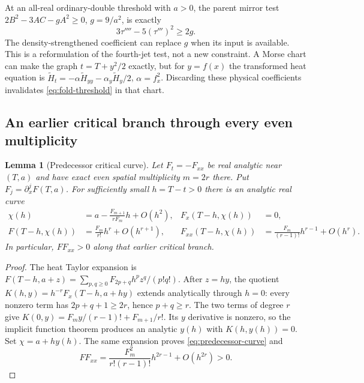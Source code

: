 \documentclass[11pt]{article}
\newtheorem{lemma}[theorem]{Lemma}
\theoremstyle{definition}
\theoremstyle{remark}
\begin{document}
At an all-real ordinary-double threshold with $a>0$, the parent mirror
test $2B^2-3AC-gA^2\ge0$, $g=9/a^2$, is exactly
\begin{equation}
 3\tau''''-5(\tau''')^2\ge2g.
 \label{eq:fold-threshold}
\end{equation}
The density-strengthened coefficient can replace $g$ when its input is
available. This is a reformulation of the fourth-jet test, not a new
constraint. A Morse chart can make the graph $t=T+y^2/2$ exactly, but
for $y=f(x)$ the transformed heat equation is
$\widetilde H_t=-\alpha\widetilde H_{yy}
-\alpha_y\widetilde H_y/2$, $\alpha=f_x^2$.
Discarding these physical coefficients invalidates
\eqref{eq:fold-threshold} in that chart.

\subsection{An earlier critical branch through every even multiplicity}

\begin{lemma}[Predecessor critical curve]
\label{lem:predecessor}
Let $F_t=-F_{xx}$ be real analytic near $(T,a)$ and have exact even
spatial multiplicity $m=2r$ there. Put $F_j=\partial_x^jF(T,a)$.
For sufficiently small $h=T-t>0$ there is an analytic real curve
\begin{align}
 \chi(h)&=a-\frac{F_{m+1}}{rF_m}h+O(h^2),
 &F_x(T-h,\chi(h))&=0,\label{eq:predecessor-curve}\\
 F(T-h,\chi(h))&=\frac{F_m}{r!}h^r+O(h^{r+1}),
 &F_{xx}(T-h,\chi(h))&=\frac{F_m}{(r-1)!}h^{r-1}+O(h^r).
 \nonumber
\end{align}
In particular, $FF_{xx}>0$ along that earlier critical branch.
\end{lemma}
\begin{proof}
The heat Taylor expansion is
$F(T-h,a+z)=\sum_{p,q\ge0}F_{2p+q}h^pz^q/(p!q!)$.
After $z=hy$, the quotient
$K(h,y)=h^{-r}F_x(T-h,a+hy)$ extends analytically through $h=0$:
every nonzero term has $2p+q+1\ge2r$, hence $p+q\ge r$.
The two terms of degree $r$ give
$K(0,y)=F_my/(r-1)!+F_{m+1}/r!$.
Its $y$ derivative is nonzero, so the implicit function theorem produces
an analytic $y(h)$ with $K(h,y(h))=0$. Set $\chi=a+hy(h)$.
The same expansion proves \eqref{eq:predecessor-curve} and
\begin{equation}
 FF_{xx}=\frac{F_m^2}{r!(r-1)!}h^{2r-1}+O(h^{2r})>0.
 \label{eq:predecessor-positive}
\end{equation}
\end{proof}
\end{document}
